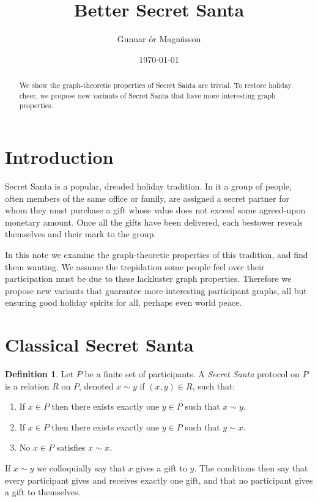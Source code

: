 \documentclass[10pt,a4paper]{amsart}
\author{Gunnar \TH\'or Magn\'usson}
\date{\today}
\title{Better Secret Santa}
\theoremstyle{definition}
\newtheorem{defi}[theo]{Definition}
\begin{document}
\begin{abstract}
We show the graph-theoretic properties of Secret Santa are trivial.
To restore holiday cheer, we propose new variants of Secret Santa
that have more interesting graph properties.
\end{abstract}

\maketitle


\section*{Introduction}

Secret Santa is a popular, dreaded holiday tradition. In it a group of people,
often members of the same office or family, are assigned a secret partner for
whom they must purchase a gift whose value does not exceed some agreed-upon
monetary amount. Once all the gifts have been delivered, each bestower reveals
themselves and their mark to the group.

In this note we examine the graph-theoretic properties of this tradition, and
find them wanting. We assume the trepidation some people feel over their
participation must be due to these lackluster graph properties.
Therefore we propose new variants that guarantee more interesting participant
graphs, all but ensuring good holiday spirits for all, perhaps even world peace.


\section{Classical Secret Santa}

\begin{defi}
Let $P$ be a finite set of participants.
A \emph{Secret Santa} protocol on $P$ is a relation $R$ on $P$, denoted $x \sim
y$ if $(x, y) \in R$, such that:
\begin{enumerate}
\item
If $x \in P$ then there exists exactly one $y \in P$ such that $x \sim y$.
\item
If $x \in P$ then there exists exactly one $y \in P$ such that $y \sim x$.
\item
No $x \in P$ satisfies $x \sim x$.
\end{enumerate}
\end{defi}

If $x \sim y$ we colloquially say that $x$ gives a gift to $y$.
The conditions then say that every participant gives and receives exactly one
gift, and that no participant gives a gift to themselves.
\end{document}

